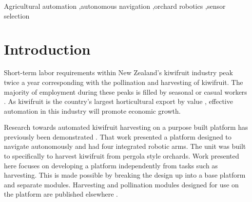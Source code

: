 \documentclass[preprint,authoryear,12pt]{elsarticle}
\begin{document}
\begin{frontmatter}
\begin{abstract}
    The selection of sensors best suited for autonomous navigation in this environment is discussed and presented with in-orchard test results.
    Details of the platform's software and hardware architecture are also discussed.
    The series-hybrid platform presented here has reliably self-navigated through two test orchards unassisted and is capable of carrying a \SI{1000}{\kilo\gram} payload.
\end{abstract}

\begin{keyword}

    Agricultural automation \sep autonomous navigation \sep orchard robotics \sep sensor selection
\end{keyword}

\end{frontmatter}

\linenumbers

\section{Introduction}
\label{sect:intro}
    Short-term labor requirements within New Zealand's kiwifruit industry peak twice a year corresponding with the pollination and harvesting of kiwifruit.
    The majority of employment during these peaks is filled by seasonal or casual workers \citep{Timmins2009}.
    As kiwifruit is the country's largest horticultural export by value \citep{StatisticsNewZealand2015}, effective automation in this industry will promote economic growth.

    Research towards automated kiwifruit harvesting on a purpose built platform has previously been demonstrated \citep{Scarfe2012}.
    That work presented a platform designed to navigate autonomously and had four integrated robotic arms.
    The unit was built to specifically to harvest kiwifruit from pergola style orchards.
    Work presented here focuses on developing a platform independently from tasks such as harvesting.
    This is made possible by breaking the design up into a base platform and separate modules.
    Harvesting and pollination modules designed for use on the platform are published elsewhere \citep{williams2017,Seabright2017}.
\end{document}
